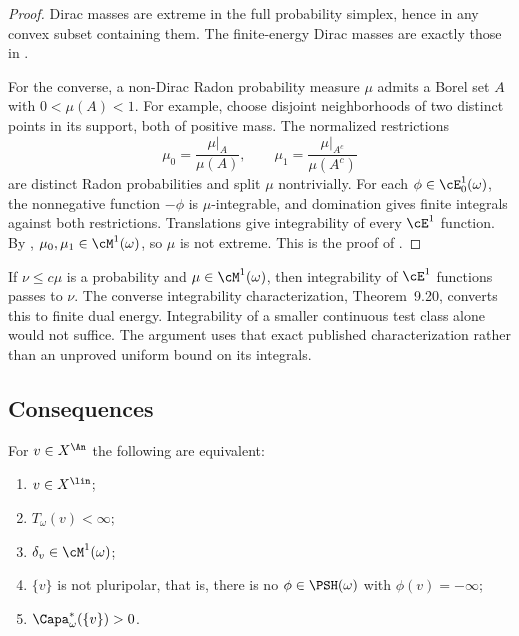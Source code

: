\begin{proof}
Dirac masses are extreme in the full probability simplex, hence in any
convex subset containing them.  The finite-energy Dirac masses are
exactly those in .

For the converse, a non-Dirac Radon probability measure $\mu$ admits
a Borel set $A$ with $0<\mu(A)<1$.  For example, choose disjoint
neighborhoods of two distinct points in its support, both of positive
mass.  The normalized restrictions
\[
 \mu_0=\frac{\mu|_A}{\mu(A)},\qquad
 \mu_1=\frac{\mu|_{A^c}}{\mu(A^c)}
\]
are distinct Radon probabilities and split $\mu$ nontrivially.
For each $\phi\in\cE^1_0(\omega)$, the nonnegative function
$-\phi$ is $\mu$-integrable, and domination gives finite integrals
against both restrictions.  Translations give integrability of every
$\cE^1$ function.  By \cite[Theorem~9.20]{BJ22},
$\mu_0,\mu_1\in\cM^1(\omega)$, so $\mu$ is not extreme.
This is the proof of \cite[Proposition~11.3]{BJ22}.
\end{proof}

\begin{remark}
\label{rem:ch49-extreme-import}
If $\nu\le c\mu$ is a probability and $\mu\in\cM^1(\omega)$, then
integrability of $\cE^1$ functions passes to $\nu$.
The converse integrability characterization, Theorem~9.20, converts this
to finite dual energy.  Integrability of a smaller continuous test class
alone would not suffice.  The argument uses that exact published
characterization rather than an unproved uniform bound on its integrals.
\end{remark}

\subsection{Consequences}
\label{sec:ch49-dirac-consequences}

\begin{corollary}
\label{cor:ch49-nonpluripolar}
For $v\in X^{\An}$ the following are equivalent:
\begin{enumerate}
\item\label{itm:ch49-npp:lin} $v\in X^{\lin}$;
\item\label{itm:ch49-npp:T} $T_\omega(v)<\infty$;
\item\label{itm:ch49-npp:dirac} $\delta_v\in\cM^1(\omega)$;
\item\label{itm:ch49-npp:polar} $\{v\}$ is not pluripolar, that is,
      there is no $\phi\in\PSH(\omega)$ with $\phi(v)=-\infty$;
\item\label{itm:ch49-npp:cap} $\Capa^*_\omega(\{v\})>0$.
\end{enumerate}
\end{corollary}

